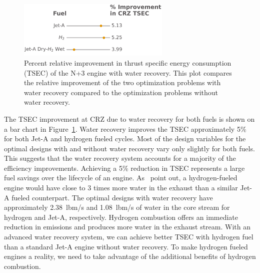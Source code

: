\documentclass[conf]{new-aiaa}
\begin{document}
\begin{figure}[hbt!]
    \centering
    \includegraphics[width=0.65\textwidth]{bar_chart.pdf}
    \caption{Percent relative improvement in thrust specific energy consumption (TSEC) of the N+3 engine with water recovery.
        This plot compares the relative improvement of the two optimization problems with water recovery compared to the optimization problems without water recovery.}
    \label{fig:barchart}
\end{figure}

The TSEC improvement at CRZ due to water recovery for both fuels is shown on a bar chart in Figure~\ref{fig:barchart}.
Water recovery improves the TSEC approximately 5\% for both Jet-A and hydrogen fueled cycles.
Most of the design variables for the optimal designs with and without water recovery vary only slightly for both fuels.
This suggests that the water recovery system accounts for a majority of the efficiency improvements.
Achieving a 5\% reduction in TSEC represents a large fuel savings over the lifecycle of an engine.
As~\citeauthor{Strom2002} point out, a hydrogen-fueled engine would have close to 3 times more water in the exhaust than a similar Jet-A fueled counterpart.
The optimal designs with water recovery have approximately \SI{2.38}{lbm/s} and \SI{1.08}{lbm/s} of water in the core stream for hydrogen and Jet-A, respectively.
Hydrogen combustion offers an immediate reduction in emissions and produces more water in the exhaust stream.
With an advanced water recovery system, we can achieve better TSEC with hydrogen fuel than a standard Jet-A engine without water recovery.
To make hydrogen fueled engines a reality, we need to take advantage of the additional benefits of hydrogen combustion.
\end{document}
